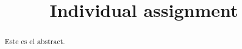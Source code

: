\documentclass{article}
\begin{document}
\renewcommand{\footrulewidth}{1pt}
\renewcommand{\tablename}{Tabla}
\author{}%
\title{Individual assignment}
\date{}
\maketitle
\begin{abstract}
Este es el abstract.              
\end{abstract}
\end{document}
